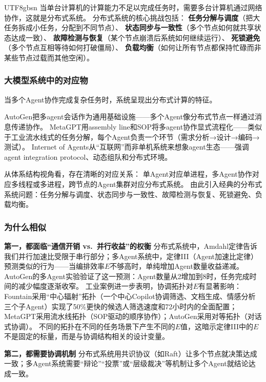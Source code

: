 \documentclass[11pt,a4paper]{article}
\begin{document}
\begin{CJK*}{UTF8}{gbsn}
当单台计算机的计算能力不足以完成任务时，需要多台计算机通过网络协作，这就是分布式系统。
分布式系统的核心挑战包括：
\textbf{任务分解与调度}（把大任务拆成小任务，分配到不同节点）、
\textbf{状态同步与一致性}（多个节点如何就共享状态达成一致）、
\textbf{故障检测与恢复}（某个节点崩溃后系统如何继续运行）、
\textbf{死锁避免}（多个节点互相等待如何打破僵局）、
\textbf{负载均衡}（如何让所有节点都保持忙碌而非某些节点过载而其他空闲）\cite{hennessy2017quantitative}。

\subsubsection{大模型系统中的对应物}

当多个Agent协作完成复杂任务时，系统呈现出分布式计算的特征。

AutoGen把多agent会话作为通用基础设施\cite{wu2023autogen}——多个Agent像分布式节点一样通过消息传递协作。
MetaGPT用assembly line和SOP将多agent协作显式流程化\cite{metagpt2023}——类似于工业流水线式的任务分解，每个Agent负责一个环节（需求分析→设计→编码→测试）。
Internet of Agents从``互联网''而非单机系统来想象agent生态\cite{ioa2024}——强调agent integration protocol、动态组队和分布式环境。

从体系结构视角看，存在清晰的对应关系：
单Agent对应单进程，多Agent协作对应多线程或多进程，跨节点的Agent集群对应分布式系统。
由此引入经典的分布式系统问题：任务分解与调度、状态同步与一致性、故障检测与恢复、死锁避免、负载均衡。

\subsubsection{为什么相似}

\textbf{第一，都面临``通信开销 vs.\ 并行收益''的权衡}
分布式系统中，Amdahl定律告诉我们并行加速比受限于串行部分；多Agent系统中，定律III（Agent加速比定律）预测类似的行为——当编排效率$E$不够高时，单纯增加Agent数量收益递减。
AutoGen的多Agent实验验证了这一预测：Agent数量从2增加到8时，任务完成时间的减少幅度逐渐收窄\cite{wu2023autogen}。
工业案例进一步表明，协调拓扑对$E$有显著影响：Fountain采用``中心辐射''拓扑（一个中心Copilot协调筛选、文档生成、情感分析三个子Agent）实现了50\%更快的候选人筛选速度和72小时内的全面配置\cite{anthropic2026agenticreport}；MetaGPT采用流水线拓扑（SOP驱动的顺序协作）；AutoGen采用对等拓扑（对话式协调）。
不同的拓扑在不同的任务场景下产生不同的$E$值，这暗示定律III中的$E$不是固定的标量，而是与协调结构相关的设计变量。

\textbf{第二，都需要协调机制}
分布式系统用共识协议（如Raft\cite{raft2014}）让多个节点就决策达成一致；多Agent系统需要``辩论''``投票''或``层级裁决''等机制让多个Agent就结论达成一致。


\end{CJK*}
\end{document}
